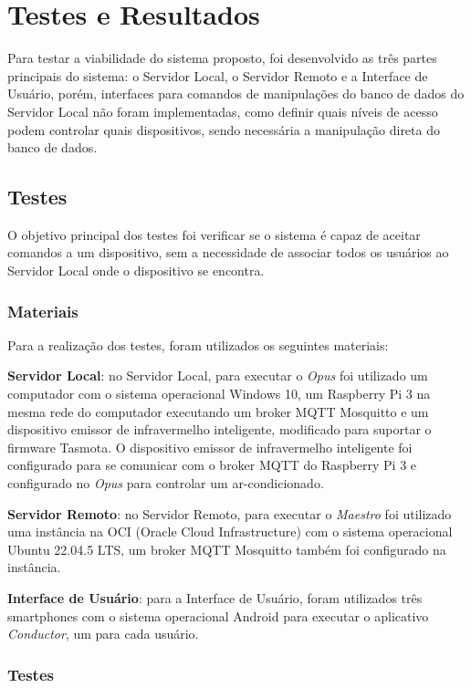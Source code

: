 \chapter{Testes e Resultados}
\label{testes_e_resultados}

Para testar a viabilidade do sistema proposto, foi desenvolvido as três partes principais do sistema: o Servidor Local, 
o Servidor Remoto e a Interface de Usuário, porém, interfaces para comandos de manipulações do banco de dados do Servidor Local não foram
implementadas, como definir quais níveis de acesso podem controlar quais dispositivos, sendo necessária a manipulação direta do banco de dados.

\section{Testes}

O objetivo principal dos testes foi verificar se o sistema é capaz de aceitar comandos a um dispositivo, sem a necessidade de associar todos os 
usuários ao Servidor Local onde o dispositivo se encontra.

\subsection{Materiais}

Para a realização dos testes, foram utilizados os seguintes materiais:

\textbf{Servidor Local}: no Servidor Local, para executar o \emph{Opus} foi utilizado um computador com o sistema operacional Windows 10,
um Raspberry Pi 3 na mesma rede do computador executando um broker MQTT Mosquitto e um dispositivo emissor de infravermelho inteligente,
modificado para suportar o firmware Tasmota. O dispositivo emissor de infravermelho inteligente foi configurado para se comunicar com o broker
MQTT do Raspberry Pi 3 e configurado no \emph{Opus} para controlar um ar-condicionado.

\textbf{Servidor Remoto}: no Servidor Remoto, para executar o \emph{Maestro} foi utilizado uma instância na OCI (Oracle Cloud Infrastructure)
com o sistema operacional Ubuntu 22.04.5 LTS, um broker MQTT Mosquitto também foi configurado na instância.

\textbf{Interface de Usuário}: para a Interface de Usuário, foram utilizados três smartphones com o sistema operacional Android para executar
o aplicativo \emph{Conductor}, um para cada usuário.

\subsection{Testes}

